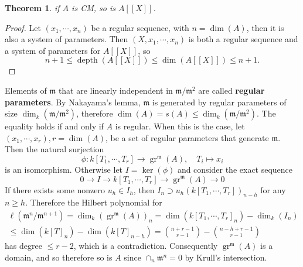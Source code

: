 \documentclass[leqno]{amsart}
\DeclareMathOperator{\gr}{gr}
\DeclareMathOperator{\depth}{depth}
\newcommand{\1}{\mathbf{1}}
\newcommand{\fm}{\mathfrak m}
\newtheorem{thm}{Theorem}[section]
\theoremstyle{definition}
\theoremstyle{remark}
\begin{document}
\begin{thm}
	if $A$ is CM, so is $A[[X]]$.
\end{thm}
\begin{proof}
	Let $(x_1,\cdots,x_n)$ be a regular sequence,
	with $n=\dim(A)$, then 
	it is also a system of parameters.
	Then  $(X,x_1,\cdots,x_n)$
	is both a regular sequence
	and a system of parameters for $A[[X]]$, so
	\[
		n+1\leq \depth(A[[X]])\leq \dim(A[[X]])\leq n+1.
	\]
\end{proof}


Elements of $\fm$ that are linearly independent in  $\fm/\fm^2$
are called \textbf{regular parameters}.
By Nakayama's lemma, 
$\fm$ is generated by regular parameters 
of size $\dim_k(\fm/\fm^2)$,
therefore  $\dim(A)=s(A)\leq \dim_k(\fm/\fm^2)$.
The equality holds if and only if  $A$ is regular.
When this is the case,
let $(x_1,\cdots,x_r), r=\dim(A)$,
be a set of regular parameters that generate $\fm$.
Then the natural surjection
\[
	\phi\colon k[T_1,\cdots,T_r]\to \gr^{\fm}(A),\quad T_i\mapsto x_i
\]
is an isomorphism.
Otherwise let $I=\ker(\phi)$ and consider the exact sequence
\[
	0\to I\to k[T_1,\cdots,T_r]\to \gr^{\fm}(A)\to 0
\]
If there exists some nonzero $u_h\in I_h$, then
$I_n\supset u_h(k[T_1,\cdots,T_r])_{n-h}$ for any $n\geq h$.
Therefore the Hilbert polynomial for
\begin{multline*}
	\ell(\fm^n/\fm^{n+1})=
	\dim_k(\gr^{\fm}(A))_n=\dim(k[T_1,\cdots,T_r]_n)-\dim_k(I_n)
	\\\leq
	\dim(k[T]_n)-\dim(k[T]_{n-h})=
	\binom{n+r-1}{r-1}-
	\binom{n-h+r-1}{r-1}
\end{multline*}
has degree $\leq r-2$, which is a contradiction.
Consequently $\gr^{\fm}(A)$ is a domain,
and so therefore so is  $A$ since  $\cap_n\fm^n=0$ 
by Krull's intersection.
\end{document}
